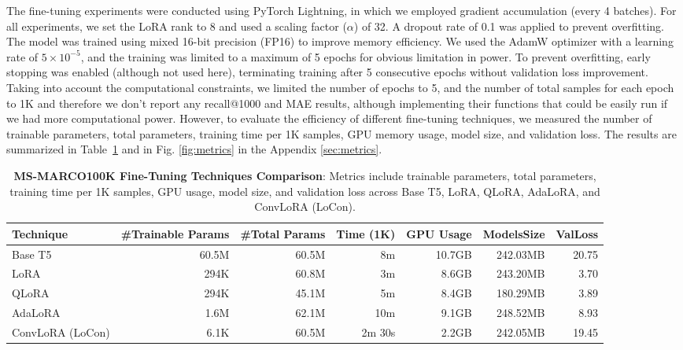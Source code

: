 The fine-tuning experiments were conducted using PyTorch Lightning, in which we employed gradient accumulation (every 4 batches). For all experiments, we set the LoRA rank to 8 and used a scaling factor (\(\alpha\)) of 32. A dropout rate of 0.1 was applied to prevent overfitting. The model was trained using mixed 16-bit precision (FP16) to improve memory efficiency. We used the AdamW optimizer with a learning rate of \(5 \times 10^{-5}\), and the training was limited to a maximum of 5 epochs for obvious limitation in power. To prevent overfitting, early stopping was enabled (although not used here), terminating training after 5 consecutive epochs without validation loss improvement. Taking into account the computational constraints, we limited the number of epochs to 5, and the number of total samples for each epoch to 1K and therefore we don't report any recall@1000 and MAE results, although implementing their functions that could be easily run if we had more computational power. However, to evaluate the efficiency of different fine-tuning techniques, we measured the number of trainable parameters, total parameters, training time per 1K samples, GPU memory usage, model size, and validation loss. The results are summarized in Table~\ref{tab:results_comparison} and in Fig. \ref{fig:metrics} in the Appendix \ref{sec:metrics}.

\begin{table}[ht]
    \centering
    \small
    \begin{tabular}{l|rrrrrr}
    \toprule
    \textbf{Technique} & \textbf{\#Trainable Params} & \textbf{\#Total Params} & \textbf{Time (1K)} & \textbf{GPU Usage} & \textbf{ModelsSize} & \textbf{ValLoss} \\
    \midrule
    Base T5         & 60.5M & 60.5M & 8m & 10.7GB & 242.03MB & 20.75\\
    LoRA            & 294K & 60.8M & 3m & 8.6GB & 243.20MB & 3.70\\
    QLoRA           & 294K & 45.1M & 5m & 8.4GB & 180.29MB & 3.89\\
    AdaLoRA           & 1.6M & 62.1M & 10m & 9.1GB & 248.52MB & 8.93\\
    ConvLoRA (LoCon)& 6.1K & 60.5M & 2m 30s & 2.2GB & 242.05MB & 19.45\\
    \bottomrule
    \end{tabular}
    \caption{\textbf{MS-MARCO100K Fine-Tuning Techniques Comparison}: Metrics include trainable parameters, total parameters, training time per 1K samples, GPU usage, model size, and validation loss across Base T5, LoRA, QLoRA, AdaLoRA, and ConvLoRA (LoCon).}
    \label{tab:results_comparison}
\end{table}

